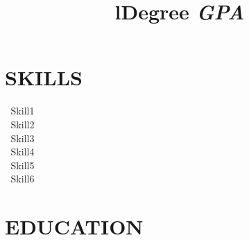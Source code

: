 \documentclass[margin]{res}
\newcommand{\tb}{\textbullet \xspace}
\newcommand{\toprule}{\noindent\makebox[\linewidth]{\rule{\paperwidth}{0.25pt}}}
\begin{document}


\address{Address1}
\address{Address2}
\address{Address3}
\address{Address4}


\begin{resume}



\section{SKILLS}
􏰚\tb Skill1 \\
􏰚\tb Skill2 \\
􏰚\tb Skill3 \\
􏰚\tb Skill4 \\
􏰚\tb Skill5 \\
􏰚\tb Skill6

\section{EDUCATION}
\begin{format}
\\
\title{l}\\
\end{format}


\title{Degree \textit{GPA}}
\begin{position}
\end{position}



\end{resume}
\end{document}
